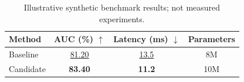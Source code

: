 \begin{table}[t]
\centering
\caption{Illustrative synthetic benchmark results; not measured experiments.}
\label{tab:benchmark}
\begin{tabular}{@{}lccc@{}}
\toprule
Method & AUC (\%) $\uparrow$ & Latency (ms) $\downarrow$ & Parameters \\
\midrule
Baseline & \underline{81.20} & \underline{13.5} & 8M \\
Candidate & \textbf{83.40} & \textbf{11.2} & 10M \\
\bottomrule
\end{tabular}
\end{table}
